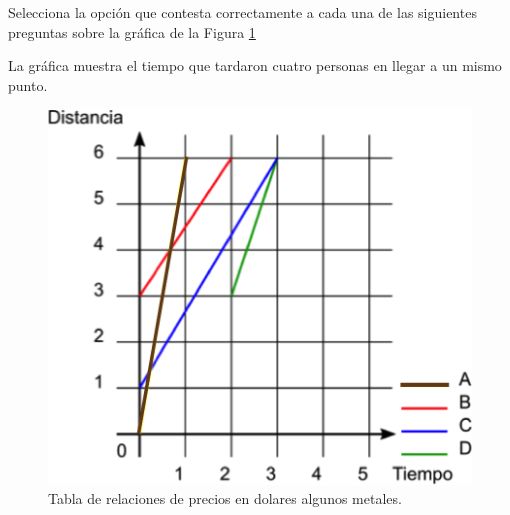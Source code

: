 Selecciona la opci\'on que contesta correctamente a cada una de las siguientes preguntas sobre la gr\'afica de la Figura \ref{fig:SINMAT1_U3_AC73_IMG1}

La gráfica muestra el tiempo que tardaron cuatro personas en llegar a un mismo punto.

\begin{multicols}{2}
    \begin{figure}[H]
        \centering
        \includegraphics[width=0.85\linewidth]{../images/SINMAT1_U3_AC73_IMG1}
        \caption{Tabla de relaciones de precios en dolares algunos metales.}
        \label{fig:SINMAT1_U3_AC73_IMG1}
    \end{figure}

    \begin{parts}
        
        
        
        
        
        
        \columnbreak
        
        
        
        
    \end{parts}
\end{multicols}